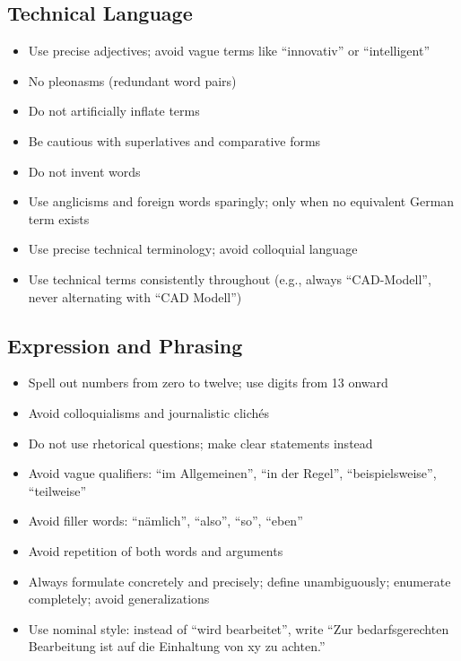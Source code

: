 \subsection{Technical Language}
\begin{itemize}
    \item Use precise adjectives; avoid vague terms like ``innovativ'' or ``intelligent''
    \item No pleonasms (redundant word pairs)
    \item Do not artificially inflate terms
    \item Be cautious with superlatives and comparative forms
    \item Do not invent words
    \item Use anglicisms and foreign words sparingly; only when no equivalent German term exists
    \item Use precise technical terminology; avoid colloquial language
    \item Use technical terms consistently throughout (e.g., always ``CAD-Modell'', never alternating with ``CAD Modell'')
\end{itemize}

\subsection{Expression and Phrasing}
\begin{itemize}
    \item Spell out numbers from zero to twelve; use digits from 13 onward
    \item Avoid colloquialisms and journalistic clichés
    \item Do not use rhetorical questions; make clear statements instead
    \item Avoid vague qualifiers: ``im Allgemeinen'', ``in der Regel'', ``beispielsweise'', ``teilweise''
    \item Avoid filler words: ``n\"amlich'', ``also'', ``so'', ``eben''
    \item Avoid repetition of both words and arguments
    \item Always formulate concretely and precisely; define unambiguously; enumerate completely; avoid generalizations
    \item Use nominal style: instead of ``wird bearbeitet'', write ``Zur bedarfsgerechten Bearbeitung ist auf die Einhaltung von xy zu achten.''
\end{itemize}

